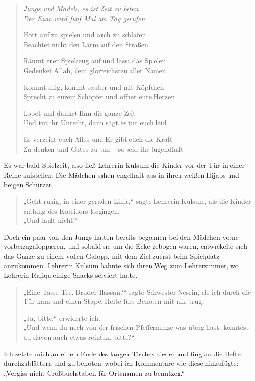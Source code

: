 \documentclass[12pt]{memoir}
\begin{document}
\begin{quote}
\itshape
Jungs und Mädels, es ist Zeit zu beten\\
Der Ezan wird fünf Mal am Tag gerufen

Hört auf zu spielen und auch zu schlafen\\
Beachtet nicht den Lärm auf den Straßen

Räumt euer Spielzeug auf und lasst das Spielen\\
Gedenket Allah, dem glorreichsten aller Namen

Kommt eilig, kommt sauber und mit Köpfchen\\
Sprecht zu eurem Schöpfer und öffnet eure Herzen

Lobet und danket Ihm die ganze Zeit\\
Und tut ihr Unrecht, dann sagt es tut euch leid

Er verzeiht euch Alles und Er gibt euch die Kraft\\
Zu denken und Gutes zu tun – so seid ihr tugendhaft
\end{quote}

Es war bald Spielzeit, also ließ Lehrerin Kulsum die Kinder
vor der Tür in einer Reihe aufstellen.
Die Mädchen sahen engelhaft aus in ihren weißen Hijabs und beigen Schürzen.

\begin{quote}
„Geht ruhig, in einer geraden Linie,“
sagte Lehrerin Kulsum, als die Kinder entlang des Korridors losgingen.\\
„Und lauft nicht!“
\end{quote}

Doch ein paar von den Jungs hatten bereits begonnen
bei den Mädchen vorne vorbeizugaloppieren,
und sobald sie um die Ecke gebogen waren,
entwickelte sich das Ganze zu einem vollen Galopp,
mit dem Ziel zuerst beim Spielplatz anzukommen.
Lehrerin Kulsum bahnte sich ihren Weg zum Lehrerzimmer,
wo Lehrerin Rafiqa einige Snacks serviert hatte.

\begin{quote}
„Eine Tasse Tee, Bruder Hassan?“
sagte Schwester Nesrin, als ich durch die Tür kam
und einen Stapel Hefte fürs Benoten mit mir trug.

„Ja, bitte,“ erwiderte ich.\\
„Und wenn du noch von der frischen Pfefferminze was übrig hast,
könntest du davon auch etwas reintun, bitte?“
\end{quote}

Ich setzte mich an einem Ende des langen Tisches nieder
und fing an die Hefte durchzublättern und zu benoten,
wobei ich Kommentare wie diese hinzufügte:
„Vergiss nicht Großbuchstaben für Ortsnamen zu benutzen.“
\end{document}
